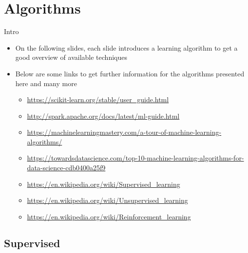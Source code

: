 
\section{Algorithms}
  \begin{frame}{Intro}
    \begin{itemize}
      \item On the following slides, each slide introduces a learning algorithm to get a good overview of available techniques
      \item Below are some links to get further information for the algorithms presented here and many more
      \begin{itemize}
        \item \url{https://scikit-learn.org/stable/user_guide.html}
        \item \url{http://spark.apache.org/docs/latest/ml-guide.html}
        \item \url{https://machinelearningmastery.com/a-tour-of-machine-learning-algorithms/}
        \item \url{https://towardsdatascience.com/top-10-machine-learning-algorithms-for-data-science-cdb0400a25f9}
        \item \url{https://en.wikipedia.org/wiki/Supervised_learning}
        \item \url{https://en.wikipedia.org/wiki/Unsupervised_learning}
        \item \url{https://en.wikipedia.org/wiki/Reinforcement_learning}
      \end{itemize}
    \end{itemize}
  \end{frame}

  \subsection{Supervised}

